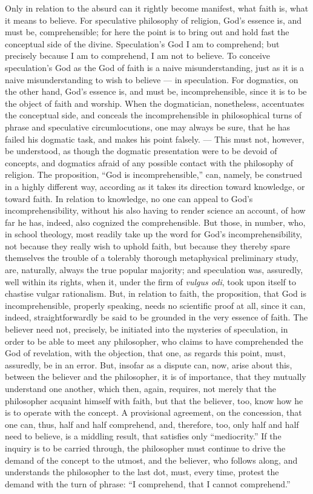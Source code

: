 \documentclass[12pt]{book}
\begin{document}
Only in relation to the absurd can it rightly become manifest, what faith is, what it means to believe. For speculative philosophy of religion, God's essence is, and must be, comprehensible; for here the point is to bring out and hold fast the conceptual side of the divine. Speculation's God I am to comprehend; but precisely because I am to comprehend, I am not to believe. To conceive speculation's God as the God of faith is a naive misunderstanding, just as it is a naive misunderstanding to wish to believe --- in speculation. For dogmatics, on the other hand, God's essence is, and must be, incomprehensible, since it is to be the object of faith and worship. When the dogmatician, nonetheless, accentuates the conceptual side, and conceals the incomprehensible in philosophical turns of phrase and speculative circumlocutions, one may always be sure, that he has failed his dogmatic task, and makes his point falsely. --- This must not, however, be understood, as though the dogmatic presentation were to be devoid of concepts, and dogmatics afraid of any possible contact with the philosophy of religion. The proposition, ``God is incomprehensible,'' can, namely, be construed in a highly different way, according as it takes its
direction toward knowledge, or toward faith. In relation to knowledge, no one can appeal to God's incomprehensibility, without his also having to render science an account, of how far he has, indeed, also cognized the comprehensible. But those, in number, who, in school theology, most readily take up the word for God's incomprehensibility, not because they really wish to uphold faith, but because they thereby spare themselves the trouble of a tolerably thorough metaphysical preliminary study, are, naturally, always the true popular majority; and speculation was, assuredly, well within its rights, when it, under the firm of \textit{vulgus odi}, took upon itself to chastise vulgar rationalism. But, in relation to faith, the proposition, that God is incomprehensible, properly speaking, needs no scientific proof at all, since it can, indeed, straightforwardly be said to be grounded in the very essence of faith. The believer need not, precisely, be initiated into the mysteries of speculation, in order to be able to meet any philosopher, who claims to have comprehended the God of revelation, with the objection, that one, as regards this point, must, assuredly, be in an error. But, insofar as a dispute can, now, arise about this, between the believer and the philosopher, it is of importance, that they mutually understand one another, which then, again, requires, not merely that the philosopher acquaint himself with faith, but that the believer, too, know how he is to operate with the concept. A provisional agreement, on the concession, that one can, thus, half and half comprehend, and, therefore, too, only half and half need to believe, is a
middling result, that satisfies only ``mediocrity.'' If the inquiry is to be carried through, the philosopher must continue to drive the demand of the concept to the utmost, and the believer, who follows along, and understands the philosopher to the last dot, must, every time, protest the demand with the turn of phrase: ``I comprehend, that I cannot comprehend.''
\end{document}
